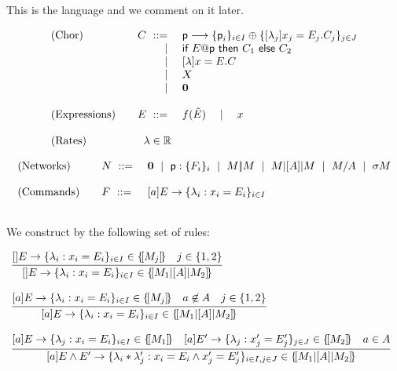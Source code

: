  This is the language and we comment on it later.



\begin{displaymath}
  \begin{array}{lrl}
    \text{(Chor)}  \quad & C \ ::=\ &
                                      \textsf{p}\longrightarrow\{\textsf{p}_i\}_{i\in
                                      I}\oplus\{[\lambda_j] x_j=E_j. C_j\}_{j\in J}\\
                         & \ \mid\ & \textsf{if } E@\textsf{p} \textsf{ then } C_1 \textsf{ else }
                                     C_2\\
                         & \ \mid\ & [\lambda]x=E. C\\
                         & \ \mid\ & X\\
                         & \ \mid\ & \mathbf{0}\\\\
    \text{(Expressions)}\quad & E \ ::=\ & f(\tilde E)\quad\mid\quad x\\\\
    \text{(Rates)}\quad       & \lambda\in\mathbb R
  \end{array}
\end{displaymath}


\begin{displaymath}
  \begin{array}{lll}
    \text{(Networks)}  \quad & N \ ::=\ & \mathbf{0} \ \mid\ \textsf{p}:\{F_i\}_i\ \mid\ M |\!| M\ \mid\ M |[A]| M\ \mid\ M/A\ \mid\ \sigma M\\\\
    \text{(Commands)}  \quad & F \ ::=\ & [a] E \rightarrow \{\lambda_i: x_i = E_i\}_{i\in I}\\\\
  \end{array}
\end{displaymath}

 We construct by the following set of rules:

\begin{displaymath}
  \begin{array}{lll}
    \infer[]
    {\cmd{}E{\lambda_i}{x_i}{E_i}{i\in I}\in \sem{M_1\ppp A M_2}}
    {\cmd{}E{\lambda_i}{x_i}{E_i}{i\in I}\in \sem{M_j}
    & j\in\{1,2\}}
    \\\\
    \infer[]
    {\cmd aE{\lambda_i}{x_i}{E_i}{i\in I}\in \sem{M_1\ppp A M_2}}
    {\cmd aE{\lambda_i}{x_i}{E_i}{i\in I}\in \sem{M_j}
    & a\not\in A    & j\in\{1,2\}}
    \\\\
    \infer[]
    {
    [a] E\land E' \rightarrow \{\lambda_i * \lambda_j': x_i = E_i \land x_j' = E_j' \}_{i\in I, j\in J}
    \in \sem{M_1\ppp A M_2}
    }
    {\cmd aE{\lambda_j}{x_i}{E_i}{i\in I}\in \sem{M_1}{}
    & \cmd a{E'}{\lambda_j}{x_j'}{E_j'}{j\in J}\in \sem{M_2}{}
    & a\in A}
  \end{array}
\end{displaymath}

